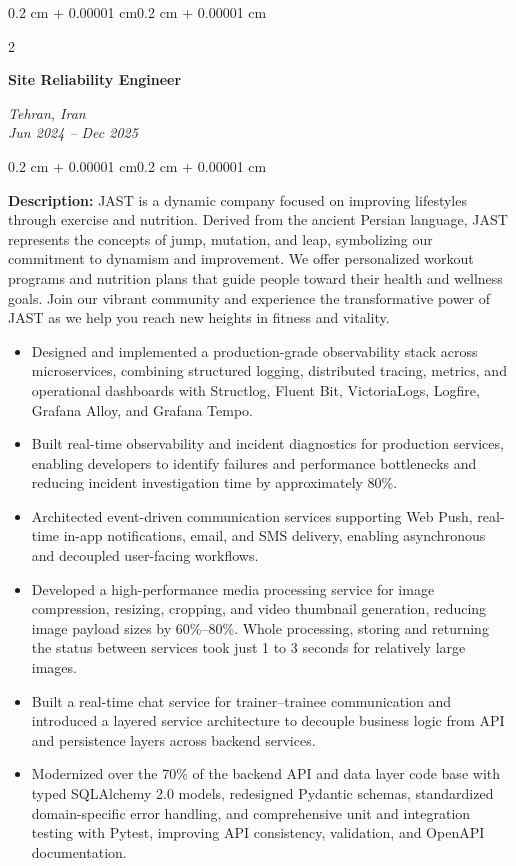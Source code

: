 \documentclass[10pt, letterpaper]{article}
\newenvironment{highlights}{
    \begin{itemize}[
        topsep=0.10 cm,
        parsep=0.10 cm,
        partopsep=0pt,
        itemsep=0pt,
        leftmargin=0.4 cm + 10pt
    ]
}{
    \end{itemize}
}
\newenvironment{onecolentry}{
    \begin{adjustwidth}{0.2 cm + 0.00001 cm}{0.2 cm + 0.00001 cm}
}{
    \end{adjustwidth}
}
\newenvironment{twocolentry}[2][]{
    \onecolentry
    \def\secondColumn{#2}
    \setcolumnwidth{\fill, 4.5 cm}
    \begin{paracol}{2}
}{
    \switchcolumn \raggedleft \secondColumn
    \end{paracol}
    \endonecolentry
}
\let\hrefWithoutArrow\href
\renewcommand{\href}[2]{\hrefWithoutArrow{#1}{\ifthenelse{\equal{#2}{}}{ }{#2 }\raisebox{.15ex}{\footnotesize \faExternalLink*}}}
\begin{document}
\begin{twocolentry}{
\textit{Tehran, Iran} \\
\textit{Jun 2024 -- Dec 2025}}
    \textbf{Site Reliability Engineer} \\
    \textit{\href{https://jast.fit/}{Jast}}
\end{twocolentry}
\vspace{0.10 cm}
\begin{onecolentry}
\textbf{Description:} JAST is a dynamic company focused on improving lifestyles through exercise and nutrition. Derived from the ancient Persian language, JAST represents the concepts of jump, mutation, and leap, symbolizing our commitment to dynamism and improvement. We offer personalized workout programs and nutrition plans that guide people toward their health and wellness goals. Join our vibrant community and experience the transformative power of JAST as we help you reach new heights in fitness and vitality.
\begin{highlights}
\item
Designed and implemented a production-grade observability stack across microservices, combining structured logging, distributed tracing, metrics, and operational dashboards with Structlog, Fluent Bit, VictoriaLogs, Logfire, Grafana Alloy, and Grafana Tempo.

\item
Built real-time observability and incident diagnostics for production services, enabling developers to identify failures and performance bottlenecks and reducing incident investigation time by approximately 80\%.

\item
Architected event-driven communication services supporting Web Push, real-time in-app notifications, email, and SMS delivery, enabling asynchronous and decoupled user-facing workflows.

\item
Developed a high-performance media processing service for image compression, resizing, cropping, and video thumbnail generation, reducing image payload sizes by 60\%--80\%. Whole processing, storing and returning the status between services took just 1 to 3 seconds for relatively large images.

\item
Built a real-time chat service for trainer--trainee communication and introduced a layered service architecture to decouple business logic from API and persistence layers across backend services.

\item
Modernized over the 70\% of the backend API and data layer code base with typed SQLAlchemy 2.0 models, redesigned Pydantic schemas, standardized domain-specific error handling, and comprehensive unit and integration testing with Pytest, improving API consistency, validation, and OpenAPI documentation.

\end{highlights}
\end{onecolentry}
\end{document}
